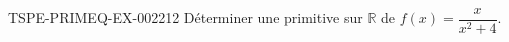 \begin{exercice}{TSPE-PRIMEQ-EX-002}{2}{12}
Déterminer une primitive sur $\mathbb{R}$ de $f(x) = \dfrac{x}{x^2+4}$.
\end{exercice}
